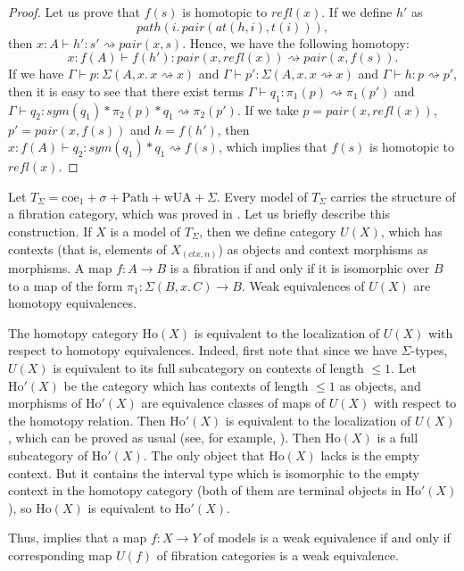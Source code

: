 \documentclass{mscs}
\newcommand{\wUA}{\mathrm{wUA}}
\newcommand{\coeT}{\mathrm{coe}}
\newcommand{\PathT}{\mathrm{Path}}
\newcommand{\Ho}{\mathrm{Ho}}
\newcommand{\refl}{\mathit{refl}}
\newcommand{\idtype}{\rightsquigarrow}
\newcommand{\pathI}{\mathit{path}}
\newcommand{\at}{\mathit{at}}
\newcommand{\sym}{\mathit{sym}}
\newcommand{\pair}{\mathit{pair}}
\numberwithin{figure}{section}
\begin{document}
\begin{proof}
Let us prove that $f(s)$ is homotopic to $\refl(x)$.
If we define $h'$ as
\[ \pathI(i.\,\pair(\at(h,i), t(i))), \]
then $x : A \vdash h' : s' \idtype \pair(x,s)$.
Hence, we have the following homotopy:
\[ x : f(A) \vdash f(h') : \pair(x, \refl(x)) \idtype \pair(x, f(s)). \]
If we have $\Gamma \vdash p : \Sigma(A, x.\,x \idtype x)$ and $\Gamma \vdash p' : \Sigma(A, x.\,x \idtype x)$ and $\Gamma \vdash h : p \idtype p'$,
then it is easy to see that there exist terms $\Gamma \vdash q_1 : \pi_1(p) \idtype \pi_1(p')$ and $\Gamma \vdash q_2 : \sym(q_1) * \pi_2(p) * q_1 \idtype \pi_2(p')$.
If we take $p = \pair(x, \refl(x))$, $p' = \pair(x, f(s))$ and $h = f(h')$, then $x : f(A) \vdash q_2 : \sym(q_1) * q_1 \idtype f(s)$,
which implies that $f(s)$ is homotopic to $\refl(x)$.
\end{proof}

Let $T_\Sigma = \coeT_1 + \sigma + \PathT + \wUA + \Sigma$.
Every model of $T_\Sigma$ carries the structure of a fibration category, which was proved in \cite{tt-fibr-cat}.
Let us briefly describe this construction.
If $X$ is a model of $T_\Sigma$, then we define category $U(X)$, which has contexts (that is, elements of $X_{(ctx,n)}$) as objects and context morphisms as morphisms.
A map $f : A \to B$ is a fibration if and only if it is isomorphic over $B$ to a map of the form $\pi_1 : \Sigma(B, x.\,C) \to B$.
Weak equivalences of $U(X)$ are homotopy equivalences.

The homotopy category $\Ho(X)$ is equivalent to the localization of $U(X)$ with respect to homotopy equivalences.
Indeed, first note that since we have $\Sigma$-types, $U(X)$ is equivalent to its full subcategory on contexts of length $\leq 1$.
Let $\Ho'(X)$ be the category which has contexts of length $\leq 1$ as objects,
and morphisms of $\Ho'(X)$ are equivalence classes of maps of $U(X)$ with respect to the homotopy relation.
Then $\Ho'(X)$ is equivalent to the localization of $U(X)$, which can be proved as usual (see, for example, \cite[Corollary~1.2.9]{hovey}).
Then $\Ho(X)$ is a full subcategory of $\Ho'(X)$.
The only object that $\Ho(X)$ lacks is the empty context.
But it contains the interval type which is isomorphic to the empty context in the homotopy category
(both of them are terminal objects in $\Ho'(X)$), so $\Ho(X)$ is equivalent to $\Ho'(X)$.

Thus,  implies that a map $f : X \to Y$ of models is a weak equivalence if and only if
corresponding map $U(f)$ of fibration categories is a weak equivalence.
\end{document}
